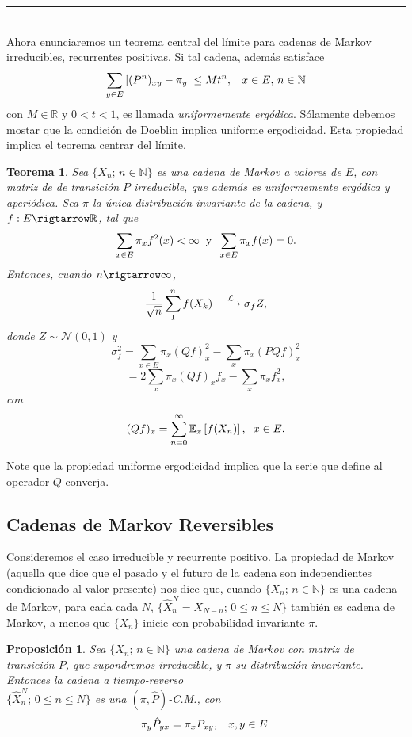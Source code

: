 \documentclass[a4paper]{article}
\newtheorem{teorema}{Teorema}
\newtheorem{prop}{Proposici\'on}
\numberwithin{equation}{subsection}
\numberwithin{definicion}{subsection}
\def\R{\mathbb R}
\def\N{\mathbb N}
\def\E{\mathbb E}
\begin{document}
\rule{0.7em}{0.7em}\\ \newline
Ahora enunciaremos un teorema central del límite para cadenas de Markov irreducibles, recurrentes positivas. Si tal cadena, además satisface
\[\sum_{y \in E}|(P^n)_{xy}-\pi_y| \leq Mt^n,\hspace{0.3cm}x \in E,\,n\in \N\]
con $M\in \R$ y $0<t<1$, es llamada \textit{uniformemente ergódica}. Sólamente debemos mostar que la condición de Doeblin implica uniforme ergodicidad. Esta propiedad implica el teorema centrar del límite.

\begin{teorema}
Sea $\{X_n;\,n\in \N\}$ es una cadena de Markov a valores de $E$, con matriz de de transición $P$ irreducible, que además es uniformemente ergódica y aperiódica. Sea $\pi$ la única distribución invariante de la cadena, y $f:E\rigtarrow \R$, tal que
\[\sum_{x\in E}\pi_x f^2(x) < \infty \hspace{0.2cm}\text{y}\hspace{0.2cm}\sum_{x \in E}\pi_x f(x) = 0.\]
Entonces, cuando $n\rigtarrow \infty$,
\[\frac{1}{\sqrt{n}}\sum_1^nf(X_k)\hspace{0.2cm}\xrightarrow{\,\,\mathcal{L}\,\,}\sigma_f Z,\]
donde $Z\sim \mathcal{N}(0,1)$ y
\[\sigma_f^2 = \sum_{x \in E}\pi_x (Qf)_x^2 - \sum_x \pi_x (PQf)_x^2\]
\[= 2\sum_x \pi_x (Qf)_x f_x - \sum_x \pi_x f_x^2,\]
con 
\[(Qf)_x = \sum_{n=0}^{\infty}\E_x\left[f(X_n)\right],\hspace{0.2cm}x\in E.\]
\end{teorema}

Note que la propiedad uniforme ergodicidad implica que la serie que define al operador $Q$ converja.

\subsection{Cadenas de Markov Reversibles}
Consideremos el caso irreducible y recurrente positivo. La propiedad de Markov (aquella que dice que el pasado y el futuro de la cadena son independientes condicionado al valor presente) nos dice que, cuando $\{X_n;\,n\in \N\}$ es una cadena de Markov, para cada cada $N$, $\{\hat{X}_n^N = X_{N-n};\,0\leq n \leq N\}$ también es cadena de Markov, a menos que $\{X_n\}$ inicie con probabilidad invariante $\pi$.
\begin{prop}
Sea $\{X_n;\,n\in\N\}$ una cadena de Markov con matriz de transición $P$, que supondremos irreducible, y $\pi$ su distribución invariante. Entonces la cadena a tiempo-reverso\\ $\{\hat{X}_n^N;\,0\leq n\leq N\}$ es una $(\pi,\hat{P})$-C.M., con
\[\pi_y \hat{P}_{yx} = \pi_x P_{xy},\hspace{0.3cm}x,y\in E.\]
\end{prop}
\end{document}
